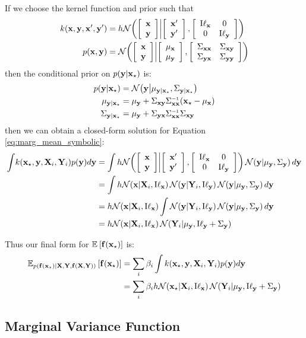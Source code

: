 If we choose the kernel function and prior such that
\begin{align}
k({\bf{x}}, {\bf{y}}, {\bf{x}}', {\bf{y}}') & = h \mathcal{N}\!\left( \left[ \begin{array}{c} {{\bf{x}}} \\ {{\bf{y}}} \end{array} \right]  \middle|  \left[ \begin{array}{c} {{\bf{x}}'} \\ {{\bf{y}}'} \end{array} \right] ,  \left[ \begin{array}{cc} { {\text I} {\bf{\ell}}_{\bf{x}}} & { 0 } \\ { 0 } & { {\text I} {\bf{\ell}}_{\bf{y}}} \end{array} \right] \right)\\
 p({\bf{x}}, {\bf{y}}) & = \mathcal{N}\!\left( \left[ \begin{array}{c} {{\bf{x}}} \\ {{\bf{y}}} \end{array} \right]  \middle|  \left[ \begin{array}{c} {\mu_{\bf{x}}} \\ {\mu_{\bf{y}}} \end{array} \right] , \left[ \begin{array}{cc} { \Sigma_{{\bf{x}}{\bf{x}}} } & { \Sigma_{{\bf{x}} {\bf{y}}} } \\ { \Sigma_{{\bf{y}} {\bf{x}}} } & { \Sigma_{{\bf{y}} {\bf{y}}} } \end{array} \right]\right)
\end{align}
then the conditional prior on $p({\bf{y}} | {\bf{x}}_\star)$ is:
\begin{align}
 p(\vy | \vx\st) & = \N{ \vy }{ \mu_{\vy | \vx\st} }{ \Sigma_{\vy | \vx\st} } \\
 \mu_{\vy | \vx\st} & = \mu_\vy + \Sigma_{\vx \vy} \Sigma_{\vx \vx}\inv ( \vx\st - \mu_\vx)\\
 \Sigma_{\vy | \vx\st} & = \mu_\vy + \Sigma_{\vy \vx} \Sigma_{\vx \vx}\inv \Sigma_{\vx \vy}\
\end{align}
then we can obtain a closed-form solution for Equation \eqref{eq:marg_mean_symbolic}:
\begin{align}
\int\! k(\vx\st, \vy, \vX_i, \vY_i) p(\vy) d\vy & = \int h \N{ \colvec{\vx}{\vy} }{ \colvec{\vx'}{\vy'} }{  \tbtmat{ {\text I} \vell_\vx }{ 0 }{ 0 }{ {\text I} \vell_\vy} } \N{\vy}{\mu_\vy}{\Sigma_\vy} d\vy \\
 & = \int h \N{ \vx } {\vX_i}{ {\text I} \vell_\vx } \N{ \vy } {\vY_i}{ {\text I} \vell_\vy } \N{\vy}{\mu_\vy}{\Sigma_\vy} d\vy \\
 & = h \N{ \vx } {\vX_i}{ {\text I} \vell_\vx } \int \N{ \vy } {\vY_i}{ {\text I} \vell_\vy } \N{\vy}{\mu_\vy}{\Sigma_\vy} d\vy \\
 & = h \N{ \vx } {\vX_i}{ {\text I} \vell_\vx } \N{\vY_i}{\mu_\vy}{{\text I} \vell_\vy + \Sigma_\vy}
\label{eq:mean_double_integral}
\end{align} 

Thus our final form for $\mathbb{E}_{} \left[ {{\bf{f}}({\bf{x}}_\star)} \right]$ is:
\begin{align}
\mathbb{E}_{ p({\bf{f}}({\bf{x}}_\star)|\mathbf{X}, \mathbf{Y}, {\bf{f}}(\mathbf{X}, \mathbf{Y}))} \left[ {{\bf{f}}({\bf{x}}_\star)} \right] & = \sum_i \beta_i \int k({\bf{x}}_\star, {\bf{y}}, \mathbf{X}_i, \mathbf{Y}_i) p({\bf{y}}) d{\bf{y}} \\
 & = \sum_i \beta_i h \mathcal{N}\!\left( {\bf{x}}_\star  \middle| \mathbf{X}_i, {\text I} {\bf{\ell}}_{\bf{x}} \right) \mathcal{N}\!\left(\mathbf{Y}_i \middle| \mu_{\bf{y}},{\text I} {\bf{\ell}}_{\bf{y}} + \Sigma_{\bf{y}}\right)
\label{eq:marg_mean_closed_form}
\end{align} 



\subsection{Marginal Variance Function}

